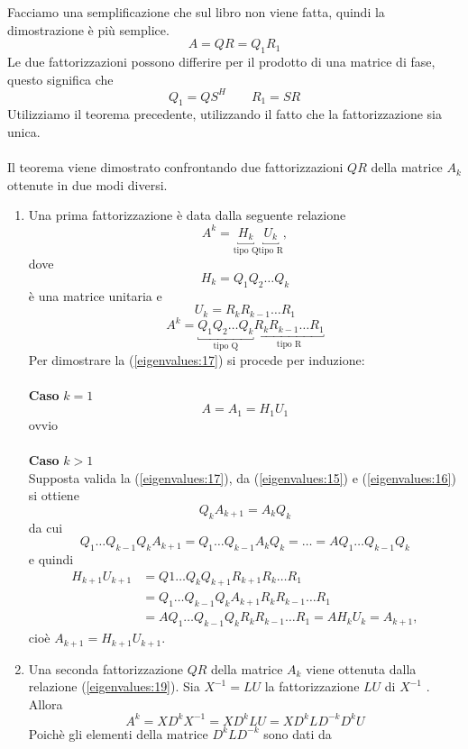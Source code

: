 \begin{thproof}
Facciamo una semplificazione che sul libro non viene fatta,
quindi la dimostrazione \`e pi\`u semplice.
$$ A = QR = Q_{1} R_1$$
Le due fattorizzazioni possono differire per il prodotto
di una matrice di fase, questo significa che
$$ Q_1 = QS^{H}  \qquad R_1 = SR $$
Utilizziamo il teorema precedente, utilizzando il fatto
che la fattorizzazione sia unica. \\ \\

 Il teorema viene dimostrato confrontando due fattorizzazioni $QR$
della matrice $A_k$ ottenute in due modi diversi.
\begin{enumerate}
\item
 Una prima fattorizzazione \`e data dalla seguente relazione
\begin{equation}
  \label{eigenvalues:17}
 A^k = \underbracket{H_k}_{\text{tipo Q}} \underbracket{U_k}_{\text{tipo R}} ,
\end{equation}
dove
$$H_k = Q_1 Q_2 \ldots Q_k$$
\`e una matrice unitaria e
$$U_k = R_k R_{k−1} \ldots R_1$$
$$A^{k} = \underbracket{Q_1 Q_2 \ldots Q_k}_{\text{tipo Q}}
 \underbracket{R_k R_{k-1} \ldots R_1}_{\text{tipo R}}$$
Per dimostrare la (\ref{eigenvalues:17}) si procede per induzione: \\ \\
\textbf{Caso} $k=1$
 $$A = A_1 = H_1 U_1$$
 ovvio
\\
\\
\textbf{Caso} $k>1$ \\
Supposta valida la (\ref{eigenvalues:17}), da
  (\ref{eigenvalues:15}) e   (\ref{eigenvalues:16}) si ottiene
$$Q_k A_{k+1} = A_k Q_k $$
da cui
\begin{equation}
 \label{eigenvalues:18}
Q_1 \ldots Q_{k-1} Q_k A_{k+1} = Q_1 \ldots Q_{k-1} A_k Q_k = \ldots = AQ_1 \ldots Q_{k-1}
 Q_k
\end{equation}
e quindi
$$
\begin{array}{ll}
H_{k+1} U_{k+1} & = Q1 \ldots Q_k Q_{k+1} R_{k+1} R_k \ldots R_1 \\
 &  = Q_1 \ldots Q_{k-1} Q_k A_{k+1} R_k R_{k-1} \ldots R_1 \\
 & = AQ_1 \ldots Q_{k-1} Q_k R_k R_{k-1} \ldots R_1 = AH_k U_k = A_{k+1} ,
\end{array}
$$
cio\`e
 $A_{k+1} = H_{k+1} U_{k+1} $.

\item
Una seconda fattorizzazione $QR$ della matrice $A_k$ viene ottenuta dalla
relazione  (\ref{eigenvalues:19}).
Sia $X^{-1} = LU $ la fattorizzazione $LU$ di $X^{-1}$
 . Allora
$$A^k = XD^k X^{-1} = XD^k LU = XD^k LD^{-k} D^{k} U$$
Poich\`e gli elementi della matrice $D^k LD^{-k}$ sono dati da


\end{enumerate}
\end{thproof}
